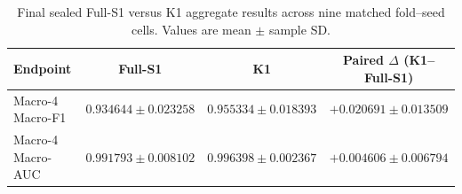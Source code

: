 \begin{table}[t]
\centering
\caption{Final sealed Full-S1 versus K1 aggregate results across nine matched fold--seed cells. Values are mean $\pm$ sample SD.}
\label{tab:main_results}
\small
\begin{tabular}{lccc}
\toprule
Endpoint & Full-S1 & K1 & Paired $\Delta$ (K1--Full-S1) \\
\midrule
Macro-4 Macro-F1 & $0.934644 \pm 0.023258$ & $0.955334 \pm 0.018393$ & $+0.020691 \pm 0.013509$ \\
Macro-4 Macro-AUC & $0.991793 \pm 0.008102$ & $0.996398 \pm 0.002367$ & $+0.004606 \pm 0.006794$ \\
\bottomrule
\end{tabular}
\end{table}

